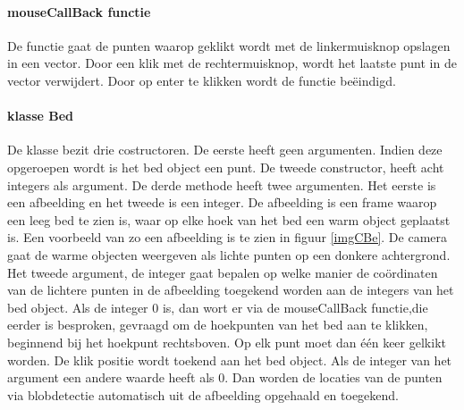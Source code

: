 \paragraph{mouseCallBack functie}
 De functie gaat de punten waarop geklikt wordt met de linkermuisknop opslagen in een vector. Door een klik met de rechtermuisknop, wordt het laatste punt in de vector verwijdert. Door op enter te klikken wordt de functie be\"eindigd. 
 
\paragraph{klasse Bed}
De klasse bezit drie costructoren. De eerste heeft geen argumenten. Indien deze opgeroepen wordt is het bed object een punt. De tweede constructor, heeft acht integers als argument. De derde methode heeft twee argumenten. Het eerste is een afbeelding en het tweede is een integer. De afbeelding is een frame waarop een leeg bed te zien is, waar op elke hoek van het bed een warm object geplaatst is. Een voorbeeld van zo een afbeelding is te zien in figuur \ref{imgCBe}. De camera gaat de warme objecten weergeven als lichte punten op een donkere achtergrond. Het tweede argument, de integer gaat bepalen op welke manier de co\"ordinaten van de lichtere punten in de afbeelding toegekend worden aan de integers van het bed object. Als de integer 0 is, dan wort er via de mouseCallBack functie,die eerder is besproken, gevraagd om de hoekpunten van het bed aan te klikken, beginnend bij het hoekpunt rechtsboven. Op elk punt moet dan \'e\'en keer gelkikt worden. De klik positie wordt toekend aan het bed object. Als de integer van het argument een andere waarde heeft als 0. Dan worden de locaties van de punten via blobdetectie automatisch uit de afbeelding opgehaald en toegekend.\\
